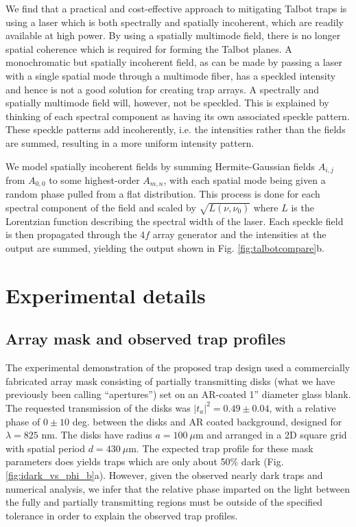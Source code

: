 We find that a practical and cost-effective approach to mitigating Talbot traps is using a laser which is both spectrally and spatially incoherent, which are readily available at high power. By using a spatially  multimode field, there is no longer spatial coherence which is required for forming the Talbot planes. A monochromatic but spatially incoherent field, as can be made by passing a laser with a single spatial mode through a  multimode fiber, has a speckled intensity and hence is not a good solution for creating trap arrays. A spectrally and spatially  multimode field will, however, not be speckled. This is explained by thinking of each spectral component as having its own associated speckle pattern. These speckle patterns add incoherently, i.e. the intensities rather than the fields are summed, resulting in a more uniform intensity pattern.

We model spatially incoherent fields by summing Hermite-Gaussian fields $A_{i,j}$ from $A_{0,0}$ to some highest-order $A_{m,n}$, with each spatial mode being given a random phase pulled from a flat distribution.  This process is done for each spectral component of the field and scaled by $\sqrt{L(\nu, \nu_0)}$ where $L$ is the Lorentzian function describing the spectral width of the laser. Each speckle field is then propagated through the $4f$ array generator and the intensities at the output are summed, yielding the output shown in Fig. \ref{fig:talbotcompare}b.

\section{Experimental details}\label{sec:experiment}

\subsection{Array mask and observed trap profiles}\label{sub:profiles}
The experimental demonstration of the proposed trap design used a commercially fabricated array mask consisting of partially transmitting disks (what we have previously been calling ``apertures'') set on an AR-coated 1'' diameter glass blank. The requested transmission of the disks was $|t_a|^2=0.49\pm 0.04$, with a relative phase of $0 \pm 10 $ deg. between the disks and AR coated background, designed for $\lambda = 825$ nm. The disks have radius $a=100~\mu$m and arranged in a 2D square grid with spatial period $d=430~\mu$m. The expected trap profile for these mask parameters does yields traps which are only about 50$\%$ dark (Fig. \ref{fig:idark_vs_phi_b}a). However, given the observed nearly dark traps and numerical analysis, we infer that the relative phase imparted on the light between the fully and partially transmitting regions must be outside of the specified tolerance in order to explain the observed trap profiles. 

